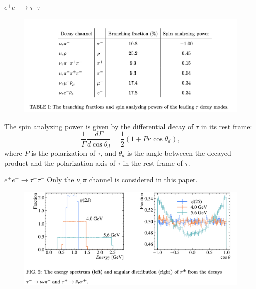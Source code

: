 \documentclass{beamer}
\begin{document}
    \begin{frame}{$e^+e^-\to \tau^+\tau^-$ \footnotesize {}}
        \begin{figure}[htbp]
            \centering
            \includegraphics[width=0.7\linewidth]{img/eetautau2.png}
        \end{figure}
        The spin analyzing power is given by the differential decay of $\tau$ in its rest frame:
        \begin{equation*}
            \frac{1}{\Gamma}\frac{d\Gamma}{d\cos\theta_d} = \frac{1}{2}(1+P\kappa\cos\theta_d),
        \end{equation*}        
        where $P$ is the polarization of $\tau$, 
        and $\theta_d$ is the angle betweeen the decayed product and the polarization axis of $\tau$ in the rest frame of $\tau$. 
    \end{frame}

    \begin{frame}{$e^+e^-\to \tau^+\tau^-$ \footnotesize {}}
        Only the $\nu_\tau\pi$ channel is considered in this paper. 
        \begin{figure}[htbp]
            \centering
            \includegraphics[width=0.8\linewidth]{img/eetautau3.png}
        \end{figure}
    \end{frame}
\end{document}
